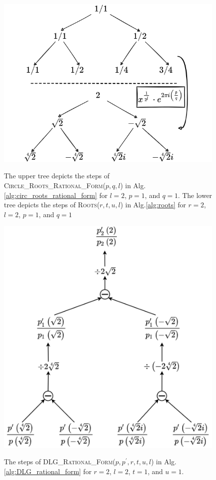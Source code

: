 \documentclass[runningheads]{llncs}
\begin{document}
\begin{figure}[h]
  \centering
  \includegraphics[width=0.8\linewidth]{rational_root_tree.png}
  \caption{The upper tree depicts the steps of \textsc{\textsc{Circle\_Roots\_Rational\_Form}}($p,q,l$) in Alg.\ref{alg:circ_roots_rational_form} for $l=2$, $p=1$, and $q=1$. The lower tree depicts the steps of \textsc{Roots}($r,t,u,l$) in Alg.\ref{alg:roots} for $r=2$, $l=2$, $p=1$, and $q=1$}\label{fig:rat_roots_tree}
  \caption{}
\end{figure}

\begin{figure}[h]
  \centering
  \includegraphics[width=0.8\linewidth]{p_prime.png}
  \caption{The steps of \textsc{DLG\_Rational\_Form}($p,p^\prime,r,t,u,l$) in Alg.\ref{alg:DLG_rational_form} for $r=2$, $l=2$, $t=1$, and $u=1$.}\label{fig:DLG}
  \caption{}
\end{figure}
\end{document}
